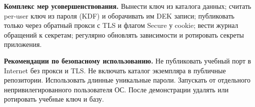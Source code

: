 \textbf{Комплекс мер усовершенствования.}
Вынести ключ из каталога данных; считать per-user ключ из пароля (KDF) и оборачивать им DEK записи; публиковать только через обратный прокси с TLS и флагом Secure у cookie; вести журнал обращений к секретам; регулярно обновлять зависимости и ротировать секреты приложения.

\textbf{Рекомендации по безопасному использованию.}
Не публиковать учебный порт в Internet без прокси и TLS. Не включать каталог экземпляра в публичные репозитории. Использовать длинные уникальные пароли. Запускать от отдельного непривилегированного пользователя ОС. После демонстрации удалять или ротировать учебные ключ и базу.
